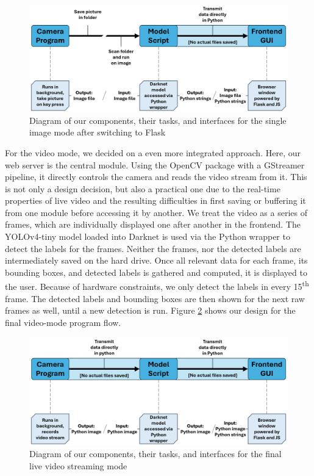 \begin{figure}[H]
    \includegraphics[width=\textwidth]{figures/process_img.png}
    \caption{Diagram of our components, their tasks, and interfaces for the single image mode after switching to Flask}
    \label{fig:program_flow_img}
\end{figure}

For the video mode, we decided on a even more integrated approach. Here, our web server is the central module. Using the OpenCV package with a GStreamer pipeline, it directly controls the camera and reads the video stream from it. This is not only a design decision, but also a practical one due to the real-time properties of live video and the resulting difficulties in first saving or buffering it from one module before accessing it by another. We treat the video as a series of frames, which are individually displayed one after another in the frontend. The YOLOv4-tiny model loaded into Darknet is used via the Python wrapper to detect the labels for the frames. Neither the frames, nor the detected labels are intermediately saved on the hard drive. Once all relevant data for each frame, its bounding boxes, and detected labels is gathered and computed, it is displayed to the user. Because of hardware constraints, we only detect the labels in every 15\textsuperscript{th} frame. The detected labels and bounding boxes are then shown for the next raw frames as well, until a new detection is run. Figure \ref{fig:program_flow_vid} shows our design for the final video-mode program flow.

\begin{figure}[H]
    \includegraphics[width=\textwidth]{figures/process_vid.png}
    \caption{Diagram of our components, their tasks, and interfaces for the final live video streaming mode}
    \label{fig:program_flow_vid}
\end{figure}


